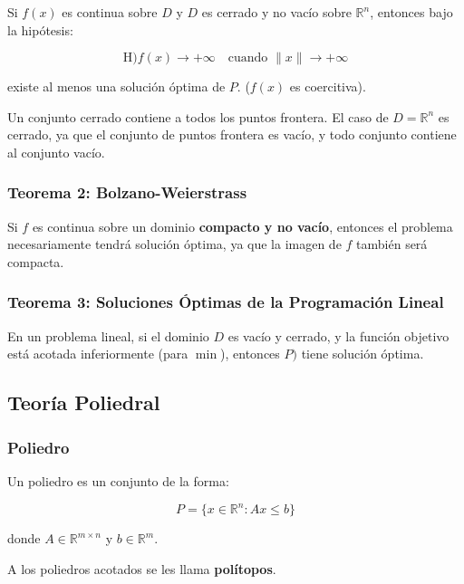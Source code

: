 \documentclass{article}
\begin{document}
Si $f(x)$ es continua sobre $D$ y $D$ es cerrado y no vacío sobre $\mathbb{R}^n$, entonces bajo la hipótesis:

\begin{equation*}
    \text{H)} f(x) \rightarrow +\infty \quad \text{cuando } \lVert x \rVert \rightarrow +\infty
\end{equation*}

existe al menos una solución óptima de $P$. ($f(x)$ es coercitiva).

Un conjunto cerrado contiene a todos los puntos frontera. El caso de $D=\mathbb{R}^n$ es cerrado, ya que el conjunto de puntos frontera es vacío, y todo conjunto contiene al conjunto vacío.

\subsubsection{Teorema 2: Bolzano-Weierstrass}

Si $f$ es continua sobre un dominio \textbf{compacto y no vacío}, entonces el problema necesariamente tendrá solución óptima, ya que la imagen de $f$ también será compacta.

\subsubsection{Teorema 3: Soluciones Óptimas de la Programación Lineal}

En un problema lineal, si el dominio $D$ es vacío y cerrado, y la función objetivo está acotada inferiormente (para $\min$), entonces $P)$ tiene solución óptima.

\subsection{Teoría Poliedral}

\subsubsection{Poliedro}

Un poliedro es un conjunto de la forma:

\begin{equation*}
    P = \{x \in \mathbb{R}^n: Ax \leq b\}
\end{equation*}

donde $A \in \mathbb{R}^{m \times n}$ y $b \in \mathbb{R}^m$.

A los poliedros acotados se les llama \textbf{polítopos}.
\end{document}
